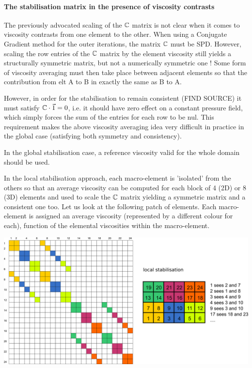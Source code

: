 \paragraph{The stabilisation matrix in the presence of viscosity contrasts}

The previously advocated scaling of the ${\mathbb{C}}$ matrix is not clear when it comes to viscosity contrasts
from one element to the other. When using a Conjugate Gradient method for the outer iterations, 
the matrix ${\mathbb{C}}$ must be SPD. However, scaling the row entries of the ${\mathbb{C}}$ matrix by the element 
viscosity still yields a structurally symmetric matrix, but not a numerically symmetric one !
Some form of viscosity averaging must then take place between adjacent elements so that the contribution 
from elt A to B in exactly the same as B to A.  

However, in order for the stabilisation to remain consistent (FIND SOURCE) it must 
satisfy ${\mathbb{C}}\cdot \vec{1}= 0$, 
i.e. it should have zero effect on a constant pressure field, which simply forces
the sum of the entries for each row to be nul. This requirement makes the above viscosity averaging 
idea very difficult in practice in the global case (satisfying both symmetry and consistency).

In the global stabilisation case, a reference viscosity valid for the whole domain should be used. 

In the local stabilisation approach, each macro-element is 'isolated' from the others so that an average
viscosity can be computed for each block of 4 (2D) or 8 (3D) elements and used to scale the ${\mathbb{C}}$ matrix
yielding a symmetric matrix and a consistent one too.
Let us look at the following patch of elements. Each macro-element is assigned an average viscosity
(represented by a different colour for each), 
function of the elemental viscosities within the macro-element. 

\begin{center}
\includegraphics[width=15cm]{images/q1p0stab/stab_local.png}
\end{center}

